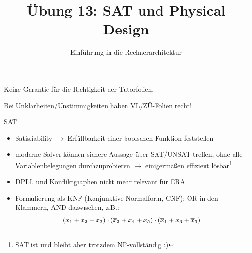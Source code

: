 



\title{Übung 13: SAT und Physical \\Design}
\subtitle{Einführung in die Rechnerarchitektur}
\date{}




\maketitle

\begin{frame}[c, fragile]{}{}
	\begin{center}
		\LARGE  Keine Garantie für die Richtigkeit der Tutorfolien.

		\Large Bei Unklarheiten/Unstimmigkeiten haben VL/ZÜ-Folien recht!
	\end{center}
\end{frame}

\begin{frame}[c]{SAT}{}
	\begin{itemize}
		\item Satisfiability $\rightarrow$ Erfüllbarkeit einer boolschen Funktion feststellen
		\item moderne Solver können sichere Aussage über SAT/UNSAT treffen, ohne alle Variablenbelegungen durchzuprobieren $\rightarrow$ einigermaßen effizient lösbar\footnote{SAT ist und bleibt aber trotzdem NP-vollständig :)}
		\item DPLL und Konfliktgraphen nicht mehr relevant für ERA
		\item Formulierung als KNF (Konjunktive Normalform, CNF): OR in den Klammern, AND dazwischen, z.B.:\[
			      (x_1+x_2+x_3)\cdot(\overline{x}_2+x_4+x_5)\cdot(\overline{x}_1+x_3+\overline{x}_5)\]
	\end{itemize}
\end{frame}

